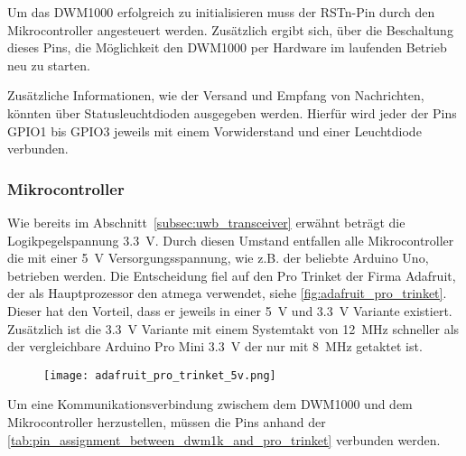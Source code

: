 Um das DWM1000 erfolgreich zu initialisieren muss der RSTn-Pin durch den Mikrocontroller angesteuert werden. Zusätzlich ergibt sich, über die Beschaltung dieses Pins, die Möglichkeit den DWM1000 per Hardware im laufenden Betrieb neu zu starten.

Zusätzliche Informationen, wie der Versand und Empfang von Nachrichten, könnten über Statusleuchtdioden ausgegeben werden. Hierfür wird jeder der Pins GPIO1 bis GPIO3 jeweils mit einem Vorwiderstand und einer Leuchtdiode verbunden.


%
%
%
\subsubsection{Mikrocontroller}

Wie bereits im Abschnitt~\ref{subsec:uwb_transceiver} erwähnt beträgt die Logikpegelspannung \SI{3.3}{\volt}. Durch diesen Umstand entfallen alle Mikrocontroller die mit einer \SI{5}{\volt} Versorgungsspannung, wie z.B. der beliebte Arduino Uno, betrieben werden. Die Entscheidung fiel auf den Pro Trinket\footnotemark{} der Firma Adafruit, der als Hauptprozessor den \Gls{atmega} verwendet, siehe \autoref{fig:adafruit_pro_trinket}. Dieser hat den Vorteil, dass er jeweils in einer \SI{5}{\volt} und \SI{3.3}{\volt} Variante existiert. Zusätzlich ist die \SI{3.3}{\volt} Variante mit einem Systemtakt von \SI{12}{\MHz} schneller als der vergleichbare Arduino Pro Mini \SI{3.3}{\volt} der nur mit \SI{8}{\MHz} getaktet ist.

\begin{figure}
	\centering
	\texttt{[image: adafruit\_pro\_trinket\_5v.png]}
	\label{fig:adafruit_pro_trinket}
\end{figure}


Um eine Kommunikationsverbindung zwischem dem DWM1000 und dem Mikrocontroller herzustellen, müssen die Pins anhand der \autoref{tab:pin_assignment_between_dwm1k_and_pro_trinket} verbunden werden.


%
%
